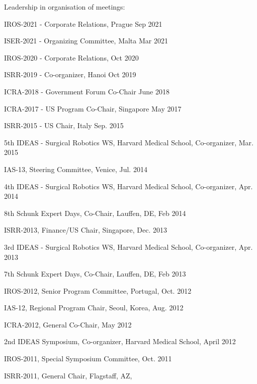 \documentclass{article}
\begin{document}
\begin{cv}
\begin{cvlist}{Leadership in organisation of meetings:}
\item IROS-2021 - Corporate Relations, Prague \cftdotfill{\cftdotsep}
  Sep 2021
\item ISER-2021 - Organizing Committee, Malta \cftdotfill{\cftdotsep}
  Mar 2021
\item IROS-2020 - Corporate Relations, \cftdotfill{\cftdotsep}
  Oct 2020
\item ISRR-2019 - Co-organizer, Hanoi \cftdotfill{\cftdotsep}
  Oct 2019
\item ICRA-2018 - Government Forum Co-Chair \cftdotfill{\cftdotsep}
  June 2018
\item ICRA-2017 - US Program Co-Chair, Singapore
  \cftdotfill{\cftdotsep} May 2017
\item ISRR-2015 - US Chair, Italy \cftdotfill{\cftdotsep} Sep. 2015
\item 5th IDEAS - Surgical Robotics WS, Harvard Medical School,
  Co-organizer, \cftdotfill{\cftdotsep} Mar. 2015
\item IAS-13, Steering Committee, Venice, \cftdotfill{\cftdotsep}
  Jul. 2014
\item 4th IDEAS - Surgical Robotics WS, Harvard Medical School,
  Co-organizer, \cftdotfill{\cftdotsep} Apr. 2014
\item 8th Schunk Expert Days, Co-Chair, Lauffen, DE,
  \cftdotfill{\cftdotsep} Feb 2014
\item ISRR-2013, Finance/US Chair, Singapore, \cftdotfill{\cftdotsep}
  Dec. 2013
\item 3rd IDEAS - Surgical Robotics WS, Harvard Medical School,
  Co-organizer, \cftdotfill{\cftdotsep} Apr. 2013
\item 7th Schunk Expert Days, Co-Chair, Lauffen, DE,
  \cftdotfill{\cftdotsep} Feb 2013
\item IROS-2012, Senior Program Committee,
  Portugal,\cftdotfill{\cftdotsep} Oct. 2012
\item IAS-12, Regional Program Chair, Seoul, Korea,
  \cftdotfill{\cftdotsep} Aug. 2012
\item ICRA-2012, General Co-Chair, \cftdotfill{\cftdotsep} May 2012
\item 2nd IDEAS Symposium, Co-organizer, Harvard Medical School,
  \cftdotfill{\cftdotsep} April 2012
\item IROS-2011, Special Symposium Committee, \cftdotfill{\cftdotsep}
  Oct. 2011
\item ISRR-2011, General Chair, Flagstaff, AZ, \cftdotfill{\cftdotsep}

\end{cvlist}
\end{cv}
\end{document}
